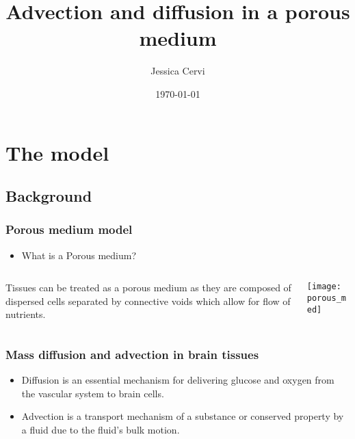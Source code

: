 \documentclass{beamer}
\title{Advection and diffusion in a porous medium}
\author{Jessica Cervi}
\date{\today}
\begin{document}
\begin{frame}
\maketitle
\end{frame}
\begin{frame}
 \tableofcontents
\end{frame}

\section{The model}
\subsection{Background}
\begin{frame}
\frametitle{Porous medium model}
\begin{itemize}
\item What is a \alert{Porous medium?}
\end{itemize}
\vspace{1cm}
 \begin{columns}
      \begin{column}{0.5\textwidth}
 Tissues can be treated as a porous medium as they are  composed of dispersed cells separated by connective voids which allow for flow of nutrients.
      \end{column}
      \begin{column}{0.4\textwidth}
         \texttt{[image: porous\_med]}
      \end{column}
   \end{columns}


\end{frame}

\begin{frame}
\frametitle{Mass diffusion and advection in brain tissues}
\begin{itemize}
\item \alert{Diffusion} is an essential mechanism for delivering glucose and oxygen from the vascular system to brain cells.
\item \alert{Advection} is a transport mechanism of a substance or conserved property by a fluid due to the fluid's bulk motion.
\end{itemize}
\end{frame}
\end{document}
